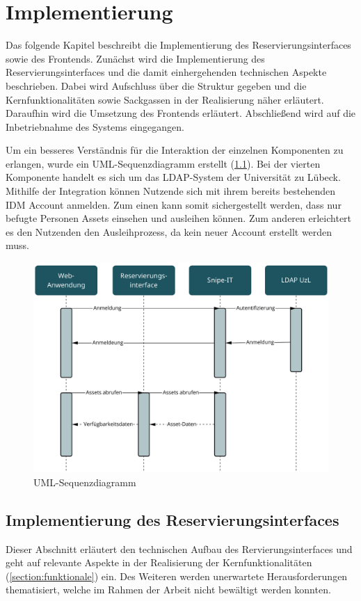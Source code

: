 
\chapter{Implementierung}
\label{chapter-implementierung}
Das folgende Kapitel beschreibt die Implementierung des Reservierungsinterfaces sowie des Frontends.
Zunächst wird die Implementierung des Reservierungsinterfaces und die damit einhergehenden
technischen Aspekte beschrieben. Dabei wird Aufschluss über die Struktur gegeben und die
Kernfunktionalitäten sowie Sackgassen in der Realisierung
näher erläutert. Daraufhin wird die Umsetzung des Frontends erläutert. Abschließend wird auf die
Inbetriebnahme des Systems eingegangen.

Um ein besseres Verständnis für die Interaktion der einzelnen Komponenten zu erlangen, wurde ein
UML-Sequenzdiagramm erstellt (\ref{fig:uml}). Bei der vierten Komponente handelt es sich um das
LDAP-System der Universität zu Lübeck. Mithilfe der Integration können Nutzende sich mit ihrem
bereits bestehenden IDM Account anmelden. Zum einen kann somit sichergestellt werden, dass nur
befugte Personen Assets einsehen und ausleihen können. Zum anderen erleichtert es den Nutzenden den
Ausleihprozess, da kein neuer Account erstellt werden muss.

\begin{figure}[h]
  \centering
  \includegraphics[scale=0.45]{Bilder/uml.pdf}
  \caption[UML-Sequenzdiagramm]{UML-Sequenzdiagramm}
  \label{fig:uml}
\end{figure}




\section{Implementierung des Reservierungsinterfaces}
Dieser Abschnitt erläutert den technischen Aufbau des Rervierungsinterfaces und geht auf relevante
Aspekte in der Realisierung der Kernfunktionalitäten (\ref{section:funktionale}) ein. Des Weiteren
werden unerwartete Herausforderungen thematisiert, welche im Rahmen der Arbeit nicht bewältigt
werden konnten.


